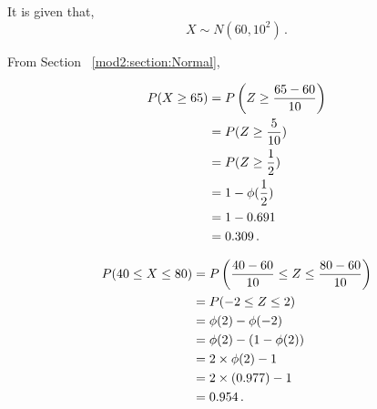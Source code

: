 \begin{subquestions}
\subquestion

It is given that,
\begin{equation}
	X \sim N(60, 10^2) \,.
\end{equation}

From Section ~\ref{mod2:section:Normal},

\begin{subsubquestions}
	
\subsubquestion

\begin{align}
	P(X \geq 65) & = P\left( Z \geq \frac{65-60}{10} \right) \nonumber \\
	             & = P(Z \geq \frac{5}{10}) \nonumber \\
	             & = P(Z \geq \frac{1}{2}) \nonumber \\
	             & = 1 - \phi(\frac{1}{2}) \nonumber \\
	             & = 1 - 0.691 \nonumber \\
	             & = 0.309 \,.	
\end{align}


\subsubquestion

\begin{align}
	P(40 \leq X \leq 80) & = P \left( \frac{40-60}{10} \leq Z \leq \frac{80-60}{10} \right) \nonumber \\
						 & = P(-2 \leq Z \leq 2) \nonumber \\
						 & = \phi(2) - \phi(-2) \nonumber \\
						 & = \phi(2) - (1 - \phi(2)) \nonumber \\
						 & = 2 \times \phi(2) - 1 \nonumber \\
						 & = 2 \times (0.977) - 1 \nonumber \\
						 & = 0.954 \,.
\end{align}


\end{subsubquestions}

\end{subquestions}

